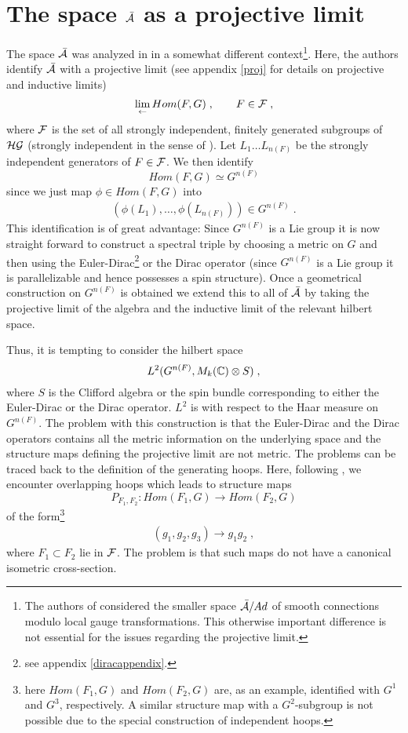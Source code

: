 \documentclass[12pt]{article}
\newcommand{\ba}{\begin{eqnarray}}
\newcommand{\ea}{\end{eqnarray}}
\def\f{\phi}
\def\ca{{\cal A}}
\def\cf{{\cal F}}
\def\cg{{\cal G}}
\def\ch{{\cal H}}
\newcommand{\bbC}{{\Bbb C}}
\begin{document}
\section{The space $\bar{\ca}$ as a projective limit }
\label{sec-projectivelimit}


The space $\bar{\ca}$ was analyzed in \cite{Marolf:1994cj} in a somewhat different
context\footnote{The authors of \cite{Marolf:1994cj} considered the
  smaller space $\bar{\ca}/Ad$ of smooth connections modulo local gauge
  transformations. This otherwise important difference is not essential for
  the issues regarding the projective limit.}. Here, the authors identify $\bar{\ca}$ with a projective
limit (see appendix \ref{proj} for details on projective and inductive limits)
\[
\lim_{\leftarrow} Hom(F,G)\;,\qquad F\in\cf\;,
\] 
where $\cf$ is the set of all strongly independent, finitely
generated subgroups of $\ch\cg$ (strongly independent in the sense of \cite{Ashtekar:1993wf}).
Let $L_1\ldots L_{n(F)}$ be the strongly independent generators of
$F\in\cf$. We 
then identify 
$$Hom(F,G)\simeq G^{n(F)}$$ since we just map $\f\in Hom(F,G)$
into \cite{Ashtekar:1993wf} 
\ba
(\f(L_1),\ldots, \f(L_{n(F)}))\in G^{n(F)}\;.
\label{identification}
\ea
This identification is of great advantage: Since $G^{n(F)}$ is a Lie group it is now
straight forward to construct a spectral triple by choosing a metric on $G$
and then using the Euler-Dirac\footnote{see appendix \ref{diracappendix}.} or the
Dirac operator (since $G^{n(F)}$ is a Lie group it is parallelizable and hence
possesses a spin structure). Once a geometrical construction on $G^{n(F)}$ is
obtained we extend this to all of $\bar{\ca}$ by taking the projective limit of
the algebra and the inductive limit of the relevant hilbert space. 

Thus, it is tempting to consider the hilbert
space 
\[
L^2(G^{n(F)},M_k(\bbC)\otimes S)\;,
\] 
where $S$ is the Clifford algebra or the spin bundle corresponding to either
the Euler-Dirac or the Dirac operator. $L^2$ is with respect to the Haar
measure on $G^{n(F)}$. The problem with this construction is
that the Euler-Dirac and the Dirac operators contains all the metric information on
the underlying space \cite{ConnesBook} and the structure maps defining the
projective limit are not metric. The problems can be traced back to the
definition of the generating hoops. Here, following \cite{Ashtekar:1993wf}, we
encounter overlapping hoops which leads to structure maps 
\[
P_{F_1,F_2} : Hom(F_1,G)\rightarrow Hom(F_2,G)
\]
of the form\footnote{here $Hom(F_1,G)$ and $Hom(F_2,G)$ are, as an example, identified with
  $G^1$ and $G^3$, respectively. A similar structure map with a $G^2$-subgroup is not possible due to the
  special construction of independent hoops.}
\ba
(g_1,g_2,g_3) \rightarrow g_1 g_2\;,
\label{structuremap}
\ea
where $F_1\subset F_2$ lie in $\cf$. The problem is that such maps do not have
a canonical isometric cross-section. 
\end{document}
